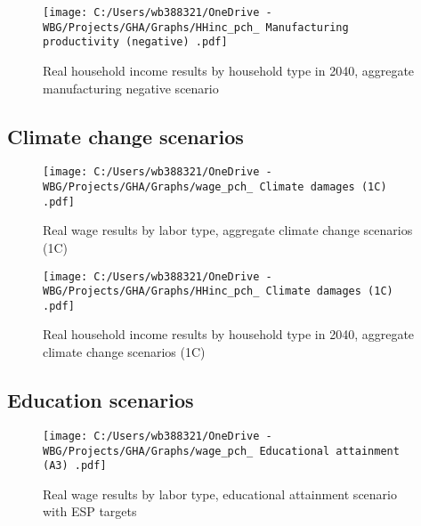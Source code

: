 \documentclass[11pt,english]{article}
\begin{document}
\begin{figure}[ht!]\caption{Real household income results by household type in 2040, aggregate manufacturing negative scenario} \label{fig_AggMNFn_HHinc_pch}
	\centering
	\texttt{[image: C:/Users/wb388321/OneDrive - WBG/Projects/GHA/Graphs/HHinc\_pch\_ Manufacturing productivity (negative) .pdf]}
\end{figure}
\clearpage

\subsection{Climate change scenarios}

\begin{figure}[ht!]\caption{Real wage results by labor type, aggregate climate change scenarios (1C) } \label{fig_wage_pch_Dmg}
	\centering
	\texttt{[image: C:/Users/wb388321/OneDrive - WBG/Projects/GHA/Graphs/wage\_pch\_ Climate damages (1C) .pdf]}
\end{figure}

\begin{figure}[ht!]\caption{Real household income results by household type in 2040, aggregate climate change scenarios (1C)} \label{fig_HHInc_pch_Dmg}
	\centering
	\texttt{[image: C:/Users/wb388321/OneDrive - WBG/Projects/GHA/Graphs/HHinc\_pch\_ Climate damages (1C) .pdf]}
\end{figure}

\clearpage
\subsection{Education scenarios}


\begin{figure}[ht!]\caption{Real wage results by labor type, educational attainment scenario with ESP targets} \label{fig_wage_pch_Ed_A3}
	\centering
	\texttt{[image: C:/Users/wb388321/OneDrive - WBG/Projects/GHA/Graphs/wage\_pch\_ Educational attainment (A3) .pdf]}
\end{figure}
\end{document}
